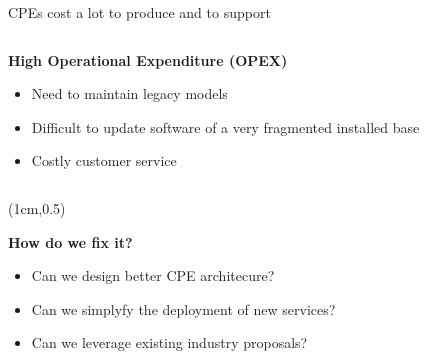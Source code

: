 \documentclass[a4paper]{beamer}
\begin{document}
\begin{frame}{CPEs cost a lot to produce and to support}
\begin{columns}[T]
																										
		\begin{column}[T]{0.75 \textwidth} %
																																							
																																								   
			\textbf{ High Operational Expenditure (OPEX)}
			\begin{itemize}
				\item Need to maintain legacy models
				\item Difficult to update software of a very fragmented installed base
				\item Costly customer service 
			\end{itemize}
																																								     
																																							
		\end{column}
																										
	\end{columns}
											
										
	\begin{textblock*}{10cm}(1cm,0.5\textheight)
		\begin{alertblock}{}
			\textbf{  How do we fix it? }
			\begin{itemize}
				\item Can we design better CPE architecure?
				\item Can we simplyfy the deployment of new services?
				\item Can we leverage existing industry proposals?
			\end{itemize}
		\end{alertblock}
	\end{textblock*}
											
\end{frame}
\end{document}
